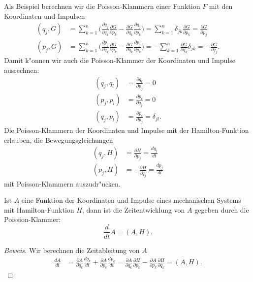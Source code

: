 Als Beispiel berechnen wir die Poisson-Klammern einer Funktion $F$
mit den Koordinaten und Impulsen
\begin{align*}
(q_j,G)
&=
\sum_{k=1}^n\biggl(
\frac{\partial q_j}{\partial q_k}\frac{\partial G}{\partial p_k}
-
\frac{\partial G}{\partial q_k}\frac{\partial q_j}{\partial p_k}
\biggr)
=
\sum_{k=1}^n\delta_{jk}\frac{\partial G}{\partial p_k}
=
\frac{\partial G}{\partial p_j}
\\
(p_j,G)
&=
\sum_{k=1}^n\biggl(
\frac{\partial p_j}{\partial q_k}\frac{\partial G}{\partial p_k}
-
\frac{\partial G}{\partial q_k}\frac{\partial p_j}{\partial p_k}
\biggr)
=
-\sum_{k=1}^n
\frac{\partial G}{\partial q_k}\delta_{jk}
=
-\frac{\partial G}{\partial q_j}.
\end{align*}
Damit k"onnen wir auch die Poisson-Klammer der Koordinaten und Impulse
ausrechnen:
\begin{align*}
(q_j,q_l)
&=
\frac{\partial q_l}{\partial p_j}
=
0
\\
(p_j,p_l)
&=
\frac{\partial p_l}{\partial q_j}
=
0
\\
(q_j,p_l)
&=
\frac{\partial p_l}{\partial p_j}
=\delta_{jl}.
\end{align*}
Die Poisson-Klammern der Koordinaten und Impulse mit der Hamilton-Funktion
erlauben, die Bewegungsgleichungen
\begin{align*}
(q_j,H)
&=
\frac{\partial H}{\partial p_j} = \frac{dq_j}{dt}
\\
(p_j,H)
&=
-\frac{\partial H}{\partial q_j} = \frac{dp_j}{dt}
\end{align*}
mit Poisson-Klammern auszudr"ucken.

\begin{satz}
\label{skript:zeitentwicklung-observable-klassisch}
Ist $A$ eine Funktion der Koordinaten und Impulse eines mechanischen Systems
mit Hamilton-Funktion $H$, dann ist die Zeitentwicklung von $A$ gegeben
durch die Poission-Klammer:
\begin{equation}
\frac{d}{dt}A
=
(A,H).
\label{skript:zeitentwicklung-poisson}
\end{equation}
\end{satz}

\begin{proof}[Beweis]
Wir berechnen die Zeitableitung von $A$
\begin{align*}
\frac{dA}{dt}
&=
\frac{\partial A}{\partial q_k}\frac{dq_k}{dt}
+
\frac{\partial A}{\partial p_k}\frac{dp_k}{dt}
=
\frac{\partial A}{\partial q_k}\frac{\partial H}{\partial p_k}
-
\frac{\partial A}{\partial p_k}\frac{\partial H}{\partial q_k}
=
(A,H).
\end{align*}
\end{proof}

